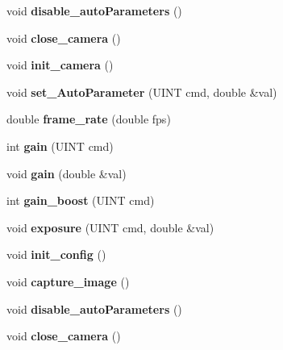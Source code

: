 \begin{DoxyCompactItemize}
\item 
\hypertarget{classCamera_a260fe77dd5b9381c07e0c5b19b58ba71}{void {\bfseries disable\-\_\-auto\-Parameters} ()}\label{classCamera_a260fe77dd5b9381c07e0c5b19b58ba71}

\item 
\hypertarget{classCamera_a2eb2e16c991848d5f556ff9a4c297a66}{void {\bfseries close\-\_\-camera} ()}\label{classCamera_a2eb2e16c991848d5f556ff9a4c297a66}

\item 
\hypertarget{classCamera_ad24264a56f7dbef2ddd202b65e8a8cde}{void {\bfseries init\-\_\-camera} ()}\label{classCamera_ad24264a56f7dbef2ddd202b65e8a8cde}

\item 
\hypertarget{classCamera_a14f056cbef5d626b0ad17f1b0a84e139}{void {\bfseries set\-\_\-\-Auto\-Parameter} (U\-I\-N\-T cmd, double \&val)}\label{classCamera_a14f056cbef5d626b0ad17f1b0a84e139}

\item 
\hypertarget{classCamera_ae6316b4da0fd2e0daaf85cfa980a82a2}{double {\bfseries frame\-\_\-rate} (double fps)}\label{classCamera_ae6316b4da0fd2e0daaf85cfa980a82a2}

\item 
\hypertarget{classCamera_afa909bbdf600871c288ff607ca4877e6}{int {\bfseries gain} (U\-I\-N\-T cmd)}\label{classCamera_afa909bbdf600871c288ff607ca4877e6}

\item 
\hypertarget{classCamera_a685e24b45a50a32a5acd7119ac14cb86}{void {\bfseries gain} (double \&val)}\label{classCamera_a685e24b45a50a32a5acd7119ac14cb86}

\item 
\hypertarget{classCamera_a5745bbcaf0aff62ade2c6d952803c48b}{int {\bfseries gain\-\_\-boost} (U\-I\-N\-T cmd)}\label{classCamera_a5745bbcaf0aff62ade2c6d952803c48b}

\item 
\hypertarget{classCamera_a48381812a08a83b2af145e1ff7becb4c}{void {\bfseries exposure} (U\-I\-N\-T cmd, double \&val)}\label{classCamera_a48381812a08a83b2af145e1ff7becb4c}

\item 
\hypertarget{classCamera_af318991ff88175df0ca94a9e2969af2a}{void {\bfseries init\-\_\-config} ()}\label{classCamera_af318991ff88175df0ca94a9e2969af2a}

\item 
\hypertarget{classCamera_aa735729e2c164e0ca18007929cc62df8}{void {\bfseries capture\-\_\-image} ()}\label{classCamera_aa735729e2c164e0ca18007929cc62df8}

\item 
\hypertarget{classCamera_a260fe77dd5b9381c07e0c5b19b58ba71}{void {\bfseries disable\-\_\-auto\-Parameters} ()}\label{classCamera_a260fe77dd5b9381c07e0c5b19b58ba71}

\item 
\hypertarget{classCamera_a2eb2e16c991848d5f556ff9a4c297a66}{void {\bfseries close\-\_\-camera} ()}\label{classCamera_a2eb2e16c991848d5f556ff9a4c297a66}

\end{DoxyCompactItemize}
